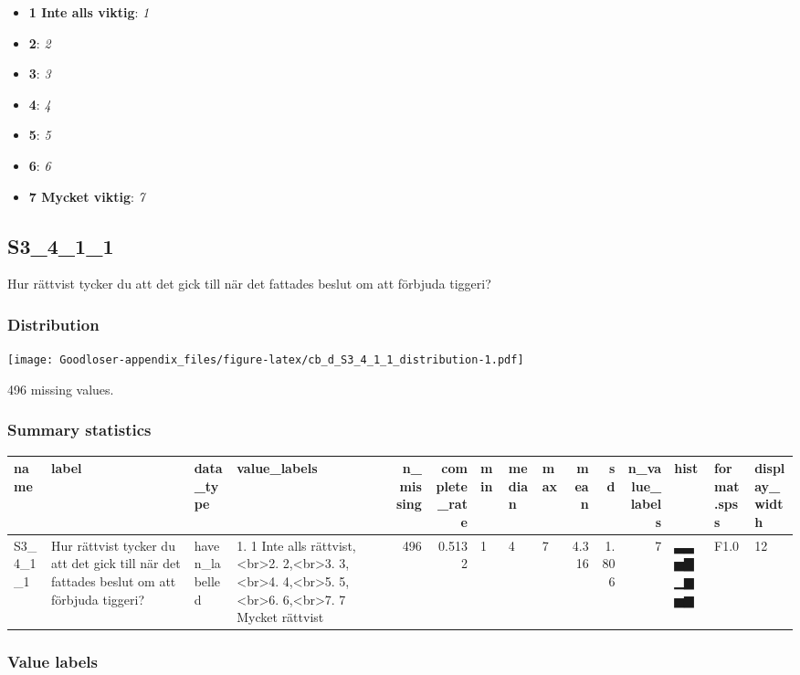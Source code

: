 \documentclass[
]{book}
\providecommand{\tightlist}{%
  \setlength{\itemsep}{0pt}\setlength{\parskip}{0pt}}
\begin{document}
\begin{itemize}
\tightlist
\item
  \textbf{1 Inte alls viktig}: \emph{1}
\item
  \textbf{2}: \emph{2}
\item
  \textbf{3}: \emph{3}
\item
  \textbf{4}: \emph{4}
\item
  \textbf{5}: \emph{5}
\item
  \textbf{6}: \emph{6}
\item
  \textbf{7 Mycket viktig}: \emph{7}
\end{itemize}

\hypertarget{S3_4_1_1}{%
\subsection{S3\_4\_1\_1}\label{S3_4_1_1}}

Hur rättvist tycker du att det gick till när det fattades beslut om att förbjuda tiggeri?

\hypertarget{S3_4_1_1_distribution}{%
\subsubsection{Distribution}\label{S3_4_1_1_distribution}}

\texttt{[image: Goodloser-appendix\_files/figure-latex/cb\_d\_S3\_4\_1\_1\_distribution-1.pdf]}

496 missing values.

\hypertarget{S3_4_1_1_summary}{%
\subsubsection{Summary statistics}\label{S3_4_1_1_summary}}

\begin{tabular}{l|l|l|l|r|r|l|l|l|r|r|r|l|l|l}
\hline
name & label & data_type & value_labels & n_missing & complete_rate & min & median & max & mean & sd & n_value_labels & hist & format.spss & display_width\\
\hline
S3_4_1_1 & Hur rättvist tycker du att det gick till när det fattades beslut om att förbjuda tiggeri? & haven_labelled & 1. 1 Inte alls rättvist,<br>2. 2,<br>3. 3,<br>4. 4,<br>5. 5,<br>6. 6,<br>7. 7 Mycket rättvist & 496 & 0.5132 & 1 & 4 & 7 & 4.316 & 1.806 & 7 & ▃▃▅▇▁▆▅▆ & F1.0 & 12\\
\hline
\end{tabular}

\hypertarget{S3_4_1_1_labels}{%
\subsubsection{Value labels}\label{S3_4_1_1_labels}}
\end{document}
